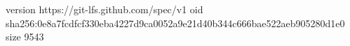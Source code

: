 version https://git-lfs.github.com/spec/v1
oid sha256:0e8a7fcdfcf330eba4227d9ca0052a9e21d40b344c666bae522aeb905280d1e0
size 9543
